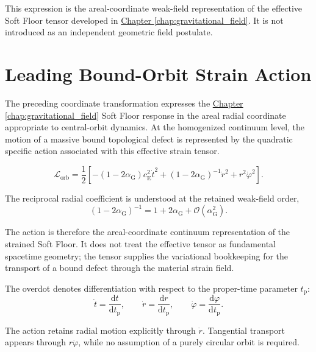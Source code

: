This expression is the areal-coordinate weak-field representation of the effective Soft Floor tensor developed in \hyperref[chap:gravitational_field]{Chapter \ref*{chap:gravitational_field}}. It is not introduced as an independent geometric field postulate.

\section{Leading Bound-Orbit Strain Action}

The preceding coordinate transformation expresses the \hyperref[chap:gravitational_field]{Chapter \ref*{chap:gravitational_field}} Soft Floor response in the areal radial coordinate appropriate to central-orbit dynamics. At the homogenized continuum level, the motion of a massive bound topological defect is represented by the quadratic specific action associated with this effective strain tensor.

\begin{equation}
    \boxed{ \mathcal{L}_{\mathrm{orb}} = \frac{1}{2} \left[ - \left( 1-2\alpha_{\mathrm{G}} \right) c_{\mathrm{E}}^2\dot{t}^2 + \left( 1-2\alpha_{\mathrm{G}} \right)^{-1} \dot{r}^2 + r^2\dot{\varphi}^2 \right] }.
\end{equation}

The reciprocal radial coefficient is understood at the retained weak-field order,
\begin{equation}
    \left( 1-2\alpha_{\mathrm{G}} \right)^{-1} = 1+2\alpha_{\mathrm{G}} + \mathcal{O}(\alpha_{\mathrm{G}}^2).
\end{equation}

The action is therefore the areal-coordinate continuum representation of the strained Soft Floor. It does not treat the effective tensor as fundamental spacetime geometry; the tensor supplies the variational bookkeeping for the transport of a bound defect through the material strain field.

The overdot denotes differentiation with respect to the proper-time parameter $t_{\mathrm{p}}$:
\begin{equation}
    \dot{t} = \frac{\mathrm{d}t}{\mathrm{d}t_{\mathrm{p}}}, \qquad \dot{r} = \frac{\mathrm{d}r}{\mathrm{d}t_{\mathrm{p}}}, \qquad \dot{\varphi} = \frac{\mathrm{d}\varphi}{\mathrm{d}t_{\mathrm{p}}}.
\end{equation}

The action retains radial motion explicitly through $\dot{r}$. Tangential transport appears through $r\dot{\varphi}$, while no assumption of a purely circular orbit is required.

